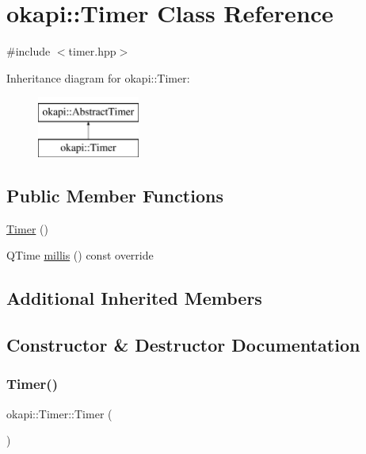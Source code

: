 \hypertarget{classokapi_1_1Timer}{}\section{okapi\+::Timer Class Reference}
\label{classokapi_1_1Timer}


{\ttfamily \#include $<$timer.\+hpp$>$}

Inheritance diagram for okapi\+::Timer\+:\begin{figure}[H]
\begin{center}
\leavevmode
\includegraphics[height=2.000000cm]{classokapi_1_1Timer}
\end{center}
\end{figure}
\subsection*{Public Member Functions}
\begin{DoxyCompactItemize}
\item 
\mbox{\hyperlink{classokapi_1_1Timer_a1161f5fa79c7c804af90e1169cba1f9f}{Timer}} ()
\item 
Q\+Time \mbox{\hyperlink{classokapi_1_1Timer_aca51b21d6302021cd24b49b64648c13c}{millis}} () const override
\end{DoxyCompactItemize}
\subsection*{Additional Inherited Members}


\subsection{Constructor \& Destructor Documentation}
\mbox{\label{classokapi_1_1Timer_a1161f5fa79c7c804af90e1169cba1f9f}} 
\subsubsection{\texorpdfstring{Timer()}{Timer()}}
{\footnotesize\ttfamily okapi\+::\+Timer\+::\+Timer (\begin{DoxyParamCaption}{ }\end{DoxyParamCaption})}




